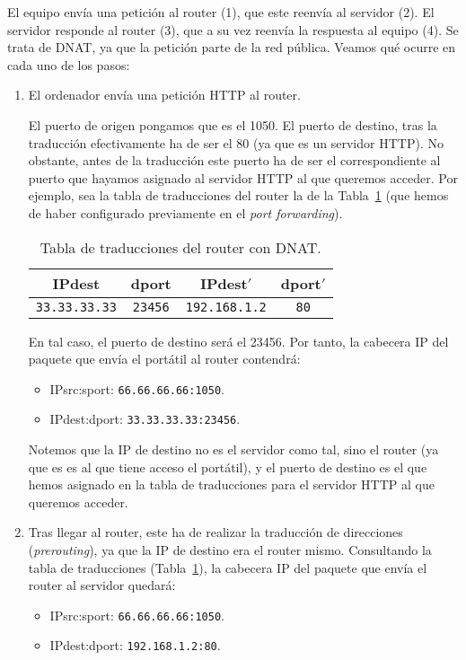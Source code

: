 \begin{ejemplo}
    El equipo envía una petición al router (1), que este reenvía al servidor (2). El servidor responde al router (3), que a su vez reenvía la respuesta al equipo (4). Se trata de \acrshort{DNAT}, ya que la petición parte de la red pública. Veamos qué ocurre en cada uno de los pasos:
    \begin{enumerate}[label=(\arabic*)]
        \item El ordenador envía una petición \acrshort{HTTP} al router.
        
        El puerto de origen pongamos que es el 1050. El puerto de destino, tras la traducción efectivamente ha de ser el 80 (ya que es un servidor \acrshort{HTTP}). No obstante, antes de la traducción este puerto ha de ser el correspondiente al puerto que hayamos asignado al servidor \acrshort{HTTP} al que queremos acceder. Por ejemplo, sea la tabla de traducciones del router la de la Tabla~\ref{tab:tabla_traducciones_DNAT} (que hemos de haber configurado previamente en el \textit{port forwarding}).
        \begin{table}[H]
            \centering
            \begin{tabular}{|c|c||c|c|}
                \hline
                IPdest & dport & IPdest$'$ & dport$'$ \\
                \hline
                \verb|33.33.33.33| & \verb|23456| & \verb|192.168.1.2| & \verb|80|\\
                \hline
            \end{tabular}
            \caption{Tabla de traducciones del router con \acrshort{DNAT}.}
            \label{tab:tabla_traducciones_DNAT}
        \end{table}

        En tal caso, el puerto de destino será el 23456. Por tanto, la cabecera IP del paquete que envía el portátil al router contendrá:
            \begin{itemize}
                \item {IPsrc}:{sport}: \verb|66.66.66.66:1050|.
                \item {IPdest}:{dport}: \verb|33.33.33.33:23456|.
            \end{itemize}
        Notemos que la IP de destino no es el servidor como tal, sino el router (ya que es es al que tiene acceso el portátil), y el puerto de destino es el que hemos asignado en la tabla de traducciones para el servidor \acrshort{HTTP} al que queremos acceder.
            
        \item Tras llegar al router, este ha de realizar la traducción de direcciones (\textit{prerouting}), ya que la IP de destino era el router mismo. Consultando la tabla de traducciones (Tabla~\ref{tab:tabla_traducciones_DNAT}), la cabecera IP del paquete que envía el router al servidor quedará:
            \begin{itemize}
                \item {IPsrc}:{sport}: \verb|66.66.66.66:1050|.
                \item {IPdest}:{dport}: \verb|192.168.1.2:80|.
            \end{itemize}


\end{enumerate}
\end{ejemplo}
